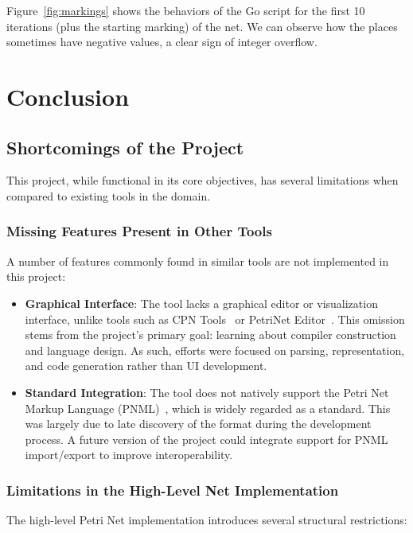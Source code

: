 \documentclass[12pt]{article}
\begin{document}
            Figure~\ref{fig:markings} shows the behaviors of the Go script for the first 10 iterations (plus the starting marking) of the net. We can observe how the places sometimes have negative values, a clear sign of integer overflow.

    
\section*{Conclusion}
    \subsection{Shortcomings of the Project}

    This project, while functional in its core objectives, has several limitations when compared to existing tools in the domain.

    \subsubsection{Missing Features Present in Other Tools}

        A number of features commonly found in similar tools are not implemented in this project:
        \begin{itemize}
            \item \textbf{Graphical Interface}: The tool lacks a graphical editor or visualization interface, unlike tools such as CPN Tools~\cite{verbeek2021cpn} or PetriNet Editor~\cite{app10217662}. This omission stems from the project's primary goal: learning about compiler construction and language design. As such, efforts were focused on parsing, representation, and code generation rather than UI development.
            \item \textbf{Standard Integration}: The tool does not natively support the Petri Net Markup Language (PNML)~\cite{weber2003petri}, which is widely regarded as a standard. This was largely due to late discovery of the format during the development process. A future version of the project could integrate support for PNML import/export to improve interoperability.
        \end{itemize}

    \subsubsection{Limitations in the High-Level Net Implementation}

        The high-level Petri Net implementation introduces several structural restrictions:
\end{document}
